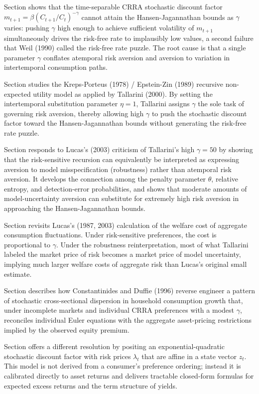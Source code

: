 Section  shows that the time-separable CRRA stochastic discount
factor $m_{t+1}=\beta(C_{t+1}/C_t)^{-\gamma}$ cannot attain the Hansen-Jagannathan
bounds as $\gamma$ varies: pushing $\gamma$ high enough to achieve sufficient volatility
of $m_{t+1}$ simultaneously drives the risk-free rate to implausibly low values,
a second failure that Weil (1990) called the risk-free rate puzzle.  The root cause
is that a single parameter $\gamma$ conflates atemporal risk aversion and aversion to
variation in intertemporal consumption paths.

Section  studies the Kreps-Porteus (1978) / Epstein-Zin (1989)
recursive non-expected utility model as applied by Tallarini (2000).  By setting the
intertemporal substitution parameter $\eta=1$, Tallarini assigns $\gamma$ the sole task
of governing risk aversion, thereby allowing high $\gamma$ to push the stochastic
discount factor toward the Hansen-Jagannathan bounds without generating the risk-free
rate puzzle.

Section  responds to Lucas's (2003) criticism of Tallarini's
high $\gamma=50$ by showing that the risk-sensitive recursion can equivalently be
interpreted as expressing aversion to model misspecification (robustness) rather than
atemporal risk aversion.  It develops the connection among the penalty parameter
$\theta$, relative entropy, and detection-error probabilities, and shows that moderate
amounts of model-uncertainty aversion can substitute for extremely high risk aversion
in approaching the Hansen-Jagannathan bounds.

Section  revisits Lucas's (1987, 2003) calculation of the
welfare cost of aggregate consumption fluctuations.  Under risk-sensitive preferences,
the cost is proportional to $\gamma$.  Under the robustness reinterpretation, most of
what Tallarini labeled the market price of risk becomes a market price of model
uncertainty, implying much larger welfare costs of aggregate risk than Lucas's original
small estimate.

Section  describes how Constantinides and Duffie (1996) reverse
engineer a pattern of stochastic cross-sectional dispersion in household consumption
growth that, under incomplete markets and individual CRRA preferences with a modest
$\gamma$, reconciles individual Euler equations with the aggregate asset-pricing
restrictions implied by the observed equity premium.

Section  offers a different resolution by positing an
exponential-quadratic stochastic discount factor with risk prices $\lambda_t$ that are
affine in a state vector $z_t$.  This model is not derived from a consumer's preference
ordering; instead it is calibrated directly to asset returns and delivers tractable
closed-form formulas for expected excess returns and the term structure of yields.

